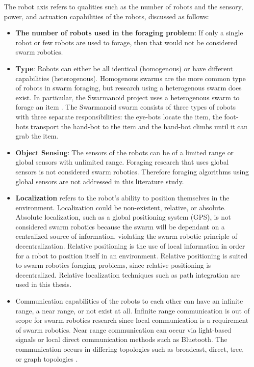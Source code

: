 The robot axis refers to qualities such as the number of robots and the sensory, power, and actuation capabilities of the robots, discussed as follows:

\begin{itemize}
\item \textbf{The number of robots used in the foraging problem}: If only a single robot or few robots are used to forage, then that would not be considered swarm robotics.

\item \textbf{Type}: Robots can either be all identical (homogenous) or have different capabilities (heterogenous). Homogenous swarms are the more common type of robots in swarm foraging, but research using a heterogenous swarm does exist. In particular, the Swarmanoid project uses a heterogenous swarm to forage an item \cite{dorigo2013swarmanoid}. The Swarmanoid swarm consists of three types of robots with three separate responsibilities: the eye-bots locate the item, the foot-bots transport the hand-bot to the item and the hand-bot climbs until it can grab the item. 

\item \textbf{Object Sensing}: The sensors of the robots can be of a limited range or global sensors with unlimited range. Foraging research that uses global sensors is not considered swarm robotics. Therefore foraging algorithms using global sensors are not addressed in this literature study.

\item \textbf{Localization} refers to the robot's ability to position themselves in the environment. Localization could be non-existent, relative, or absolute. Absolute localization, such as a global positioning system (GPS), is not considered swarm robotics because the swarm will be dependant on a centralized source of information, violating the swarm robotic principle of decentralization. Relative positioning is the use of local information in order for a robot to position itself in an environment. Relative positioning is suited to swarm robotics foraging problems, since relative positioning is decentralized. Relative localization techniques such as path integration are used in this thesis.

\item Communication capabilities of the robots to each other can have an infinite range, a near range, or not exist at all. Infinite range communication is out of scope for swarm robotics research since local communication is a requirement of swarm robotics. Near range communication can occur via light-based signals \cite{sugawara2002swarming} or local direct communication methods such as Bluetooth. The communication occurs in differing topologies such as broadcast, direct, tree, or graph topologies \cite{dudek1993taxonomy}.


\end{itemize}
